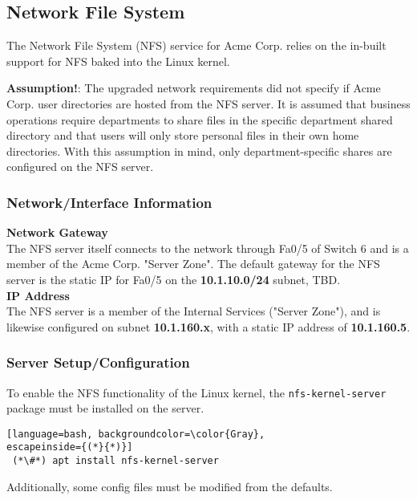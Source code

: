 \subsection{Network File System}
The Network File System (NFS) service for Acme Corp. relies on the in-built 
support for NFS baked into the Linux kernel. 

\noindent
\textbf{Assumption!}: The upgraded network requirements did not specify if Acme 
Corp. user directories are hosted from the NFS server. It is assumed that
business operations require departments to share files in the specific
department shared directory and that users will only store personal files in
their own home directories. With this assumption in mind, only
department-specific shares are configured on the NFS server.

\subsubsection{Network/Interface Information}
\textbf{Network Gateway} \\
The NFS server itself connects to the network through Fa0/5 of Switch 6 and is 
a member of the Acme Corp. "Server Zone". The default gateway for the NFS 
server is the static IP for Fa0/5 on the \textbf{10.1.10.0/24} subnet, TBD. \\

\noindent
\textbf{IP Address} \\
The NFS server is a member of the Internal Services ("Server Zone"), and is
likewise configured on subnet \textbf{10.1.160.x}, with a static IP address of 
\textbf{10.1.160.5}. \\

\subsubsection{Server Setup/Configuration}
To enable the NFS functionality of the Linux kernel, the
\lstinline$nfs-kernel-server$ package must be installed on the server.

\begin{lstlisting}[language=bash, backgroundcolor=\color{Gray}, 
escapeinside={(*}{*)}]
 (*\#*) apt install nfs-kernel-server
\end{lstlisting}
\vspace{1em}

\noindent
Additionally, some config files must be modified from the defaults. \\

